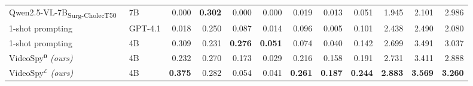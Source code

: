 {\begin{table}[!t]
{\begin{tabular}{llrrrrrrrrrr}
Qwen2.5-VL-7B\textsubscript{Surg-CholecT50}~\citep{nvidia2025qwen25vlsurg} & 7B & 0.000 & \textbf{0.302} & 0.000 & 0.000 & 0.019 & 0.013 & 0.051 & 1.945 & 2.101 & 2.986 \\
1-shot prompting~{\scriptsize\citep{su2026medgrpo}} & GPT-4.1 & 0.018 & 0.250 & 0.087 & 0.014 & 0.096 & 0.005 & 0.101 & 2.438 & 2.490 & 2.080 \\
1-shot prompting~{\scriptsize\citep{su2026medgrpo}} & 4B & 0.309 & 0.231 & \textbf{0.276} & \textbf{0.051} & 0.074 & 0.040 & 0.142 & 2.699 & 3.491 & 3.037 \\
\rowcolor{videospyblue}
VideoSpy$^{\mathbf{0}}$ {\tiny\textit{(ours)}} & 4B & 0.232  & 0.270 & 0.173 & 0.029 & 0.216 & 0.158 & 0.191 & 2.731 & 3.411 & 2.888 \\
\rowcolor{videospyblue}
VideoSpy$^{\mathcal{E}}$ {\tiny\textit{(ours)}} & 4B & \textbf{0.375} & 0.282 & 0.054 & 0.041 & \textbf{0.261} & \textbf{0.187} & \textbf{0.244} & \textbf{2.883} & \textbf{3.569} & \textbf{3.260} \\
\bottomrule
\end{tabular}%
}
\end{table}%
}


